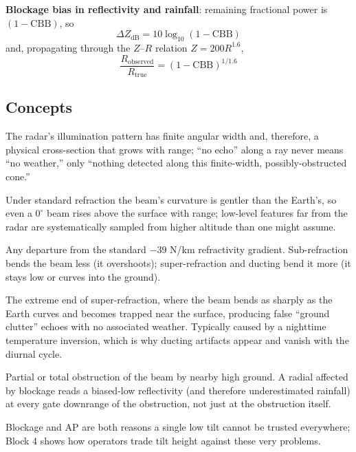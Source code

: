 \documentclass[11pt]{article}
\begin{document}
\textbf{Blockage bias in reflectivity and rainfall}: remaining fractional power is $(1-\mathrm{CBB})$, so
\begin{equation}
\Delta Z_{\mathrm{dB}} = 10\log_{10}(1-\mathrm{CBB})
\end{equation}
and, propagating through the $Z$--$R$ relation $Z = 200R^{1.6}$,
\begin{equation}
\frac{R_{\mathrm{observed}}}{R_{\mathrm{true}}} = \left(1-\mathrm{CBB}\right)^{1/1.6}
\end{equation}

\subsection{Concepts}
\begin{description}[leftmargin=1.6cm,style=nextline]
\item[Beam as a volume, not a ray] The radar's illumination pattern has finite angular width and, therefore, a physical cross-section that grows with range; ``no echo'' along a ray never means ``no weather,'' only ``nothing detected along this finite-width, possibly-obstructed cone.''
\item[Beam climb] Under standard refraction the beam's curvature is gentler than the Earth's, so even a $0^\circ$ beam rises above the surface with range; low-level features far from the radar are systematically sampled from higher altitude than one might assume.
\item[Anomalous propagation (AP)] Any departure from the standard $-39$ N/km refractivity gradient. Sub-refraction bends the beam less (it overshoots); super-refraction and ducting bend it more (it stays low or curves into the ground).
\item[Ducting / trapping] The extreme end of super-refraction, where the beam bends as sharply as the Earth curves and becomes trapped near the surface, producing false ``ground clutter'' echoes with no associated weather. Typically caused by a nighttime temperature inversion, which is why ducting artifacts appear and vanish with the diurnal cycle.
\item[Terrain blockage] Partial or total obstruction of the beam by nearby high ground. A radial affected by blockage reads a biased-low reflectivity (and therefore underestimated rainfall) at every gate downrange of the obstruction, not just at the obstruction itself.
\item[Volume Coverage Pattern context] Blockage and AP are both reasons a single low tilt cannot be trusted everywhere; Block 4 shows how operators trade tilt height against these very problems.
\end{description}
\end{document}
